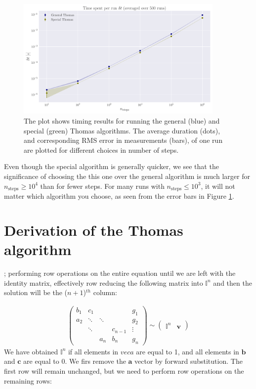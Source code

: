 \documentclass[english,notitlepage,nofootinbib]{revtex4-1}  %
\renewcommand{\vec}{\mathbf}
\newcommand{\Fig}[1]{Figure \ref{fig:#1}}
\begin{document}
\begin{figure}[h!]
    \centering
    \includegraphics[width=0.9\textwidth]{algorithms_timed.pdf}
    \caption{ The plot shows timing results for running the general (blue) and special (green) Thomas algorithms. The average duration (dots), and corresponding RMS error in measurements (bars), of one run are plotted for different choices in number of steps.}\label{fig:p10_timed}
\end{figure}

Even though the special algorithm is generally quicker, we see that the significance of choosing the this one over the general algorithm is much larger for $n_\text{steps}\geq 10^4$ than for fewer steps. For many runs with $n_\text{steps}\leq10^3$, it will not matter which algorithm you choose, as seen from the error bars in \Fig{p10_timed}.

\appendix

\section{Derivation of the Thomas algorithm}\label{Apx:Thomas_algorithm}

; performing row operations on the entire equation until we are left with the identity matrix, effectively row reducing the following matrix into $\mathbb{I}^n$ and then the solution will be the ($n+1$)$^{th}$ column:


\begin{align*}
    \begin{pmatrix}
        b_1 & c_1 & &  & g_1 \\
        a_2 & \ddots & \ddots & & g_2 \\ 
         & \ddots & & c_{n-1} & \vdots \\
          & & a_n & b_n & g_n
    \end{pmatrix}
    \sim 
    \begin{pmatrix}
        \mathbb{I}^n & \vec{v}
    \end{pmatrix}
\end{align*}
We have obtained $\mathbb{I}^n$ if all elements in $vec{a}$ are equal to 1, and all elements in $\vec{b}$ and $\vec{c}$ are equal to 0. We firs remove the $\vec{a}$ vector by forward substitution. The first row will remain unchanged, but we need to perform row operations on the remaining rows:
\end{document}
